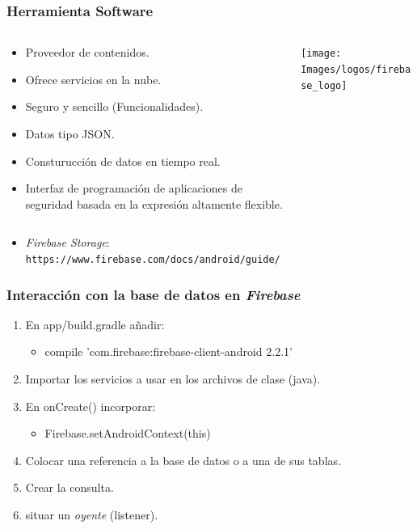 \begin{frame}
	\frametitle{Herramienta Software}
	\begin{columns}
		\begin{column}{0.6\textwidth}
			\begin{itemize}
				\item Proveedor de contenidos.
				\item Ofrece servicios en la nube.
				\item Seguro y sencillo (Funcionalidades).
				\item Datos tipo JSON.
				\item Consturucción de datos en tiempo real.
				\item Interfaz de programación de aplicaciones de seguridad basada en la expresión altamente flexible.
			\end{itemize}
			\endblock{}
		\end{column}
		\begin{column}{0.4\textwidth}
			\vfill 
			\begin{center}
				\texttt{[image: Images/logos/firebase\_logo]}
			\end{center}
		\end{column}
	\end{columns}
		\begin{itemize}
			\item {\it Firebase Storage}: \\ {\texttt{https://www.firebase.com/docs/android/guide/}}
		\end{itemize}
	\endblock{}
\end{frame}


\begin{frame}
	\frametitle{Interacción con la base de datos en {\it Firebase}}
	\begin{enumerate}
		\item En {\ttfamily app/build.gradle} añadir:
		\begin{itemize}
			\item {\ttfamily compile 'com.firebase:firebase-client-android 2.2.1'}
		\end{itemize}
		\item Importar los servicios a usar en los archivos de clase ({\ttfamily java}).
		\item  En {\ttfamily onCreate()} incorporar:
		\begin{itemize}
			\item {\ttfamily Firebase.setAndroidContext(this)}
		\end{itemize}
		\item Colocar una referencia a la base de datos o a una de sus tablas.
		\item Crear la consulta.
		\item situar un {\it oyente} ({\ttfamily listener}).
	\end{enumerate}
	\endblock{}
\end{frame}


